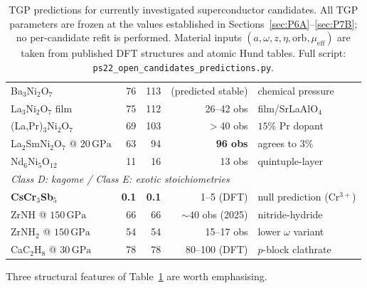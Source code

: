 \documentclass[11pt,a4paper]{article}
\newcommand{\GPa}{\,\mathrm{GPa}}
\begin{document}
\begin{table}[h]
\begin{tabular}{@{}l r r r l@{}}
Ba$_{3}$Ni$_{2}$O$_{7}$     & 76 & 113 & (predicted stable) & chemical pressure \\
La$_{3}$Ni$_{2}$O$_{7}$ film & 75 & 112 & 26--42 obs   & film/SrLaAlO$_{4}$ \\
(La,Pr)$_{3}$Ni$_{2}$O$_{7}$ & 69 & 103 & $>$40 obs    & $15\%$ Pr dopant \\
La$_{2}$SmNi$_{2}$O$_{7}$ @ $20\GPa$ & 63 & 94 & \textbf{96 obs} & agrees to $3\%$ \\
Nd$_{6}$Ni$_{5}$O$_{12}$    & 11 & 16  & 13 obs       & quintuple-layer \\
\midrule
\multicolumn{5}{l}{\textit{Class D: kagome / Class E: exotic stoichiometries}} \\[1pt]
\textbf{CsCr$_{3}$Sb$_{5}$} & \textbf{0.1} & \textbf{0.1} & 1--5 (DFT) & null prediction (Cr$^{3+}$) \\
ZrNH  @ $150\GPa$   & 66 & 66 & $\sim\!40$ obs (2025) & nitride-hydride \\
ZrNH$_{2}$ @ $150\GPa$ & 54 & 54 & 15--17 obs         & lower $\omega$ variant \\
CaC$_{2}$H$_{8}$ @ $30\GPa$ & 78 & 78 & 80--100 (DFT) & $p$-block clathrate \\
\bottomrule
\end{tabular}
\caption{TGP predictions for currently investigated superconductor
candidates.  All TGP parameters are frozen at the values established in
Sections~\ref{sec:P6A}--\ref{sec:P7B}; no per-candidate refit is
performed.  Material inputs $(a,\omega,z,\eta,\mathrm{orb},\mu_{\mathrm{eff}})$
are taken from published DFT structures and atomic Hund tables.
Full script: \texttt{ps22\_open\_candidates\_predictions.py}.}
\label{tab:open-candidates}
\end{table}

Three structural features of Table~\ref{tab:open-candidates} are worth
emphasising.
\end{document}

